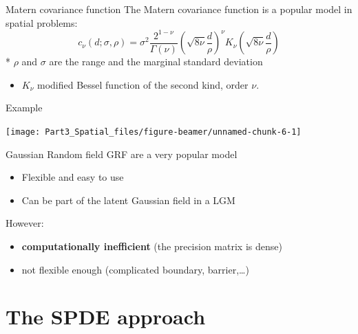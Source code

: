 \documentclass[
  ignorenonframetext,
]{beamer}
\providecommand{\tightlist}{%
  \setlength{\itemsep}{0pt}\setlength{\parskip}{0pt}}
\begin{document}
\begin{frame}{Matern covariance function}
\protect\hypertarget{matern-covariance-function}{}
The Matern covariance function is a popular model in spatial problems:
\[
c_{\nu}(d;\sigma,\rho) = \sigma^2\frac{2^{1-\nu}}{\Gamma(\nu)}\left(\sqrt{8\nu}\frac{d}{\rho}\right)^{\nu}K_{\nu}\left(\sqrt{8\nu}\frac{d}{\rho}\right)
\] * \(\rho\) and \(\sigma\) are the range and the marginal standard
deviation

\begin{itemize}
\tightlist
\item
  \(K_{\nu}\) modified Bessel function of the second kind, order
  \(\nu\).
\end{itemize}
\end{frame}

\begin{frame}{Example}
\protect\hypertarget{example}{}
\begin{center}\texttt{[image: Part3\_Spatial\_files/figure-beamer/unnamed-chunk-6-1]} \end{center}
\end{frame}

\begin{frame}{Gaussian Random field}
\protect\hypertarget{gaussian-random-field}{}
GRF are a very popular model

\begin{itemize}
\item
  Flexible and easy to use
\item
  Can be part of the latent Gaussian field in a LGM
\end{itemize}

However:

\begin{itemize}
\item
  \textbf{computationally inefficient} (the precision matrix is dense)
\item
  not flexible enough (complicated boundary, barrier,\ldots)
\end{itemize}
\end{frame}

\hypertarget{the-spde-approach}{%
\section{The SPDE approach}\label{the-spde-approach}}
\end{document}
